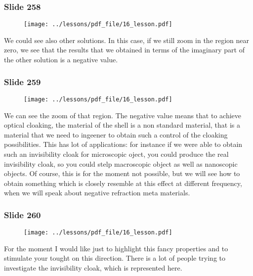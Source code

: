 \documentclass[../main/main.tex]{subfiles}
\begin{document}
\newpage

\subsubsection{Slide 258}

\begin{figure}[h!]
\centering
\texttt{[image: ../lessons/pdf\_file/16\_lesson.pdf]}
\end{figure}

We could see also other solutions. In this case, if we still zoom in the region near zero, we see that the results that we obtained in terms of the imaginary part of the other solution is a negative value.

\newpage

\subsubsection{Slide 259}

\begin{figure}[h!]
\centering
\texttt{[image: ../lessons/pdf\_file/16\_lesson.pdf]}
\end{figure}

We can see the zoom of that region.
The negative value means that to achieve optical cloaking, the material of the shell is a non standard material, that is a material that we need to ingeener to obtain such a control of the cloaking possibilities. This has lot of applications: for instance if we were able to obtain such an invisibility cloak for microscopic oject, you could produce the real invisibility cloak, so you could stelp macroscopic object as well as nanoscopic objects. Of course, this is for the moment not possible, but we will see how to obtain something which is closely resemble at this effect at different frequency, when we will speak about negative refraction meta materials.

\newpage

\subsubsection{Slide 260}

\begin{figure}[h!]
\centering
\texttt{[image: ../lessons/pdf\_file/16\_lesson.pdf]}
\end{figure}

For the moment I would like just to highlight this fancy properties and to stimulate your tought on this direction. There is a lot of people trying to investigate the invisibility cloak, which is represented here.
\end{document}
